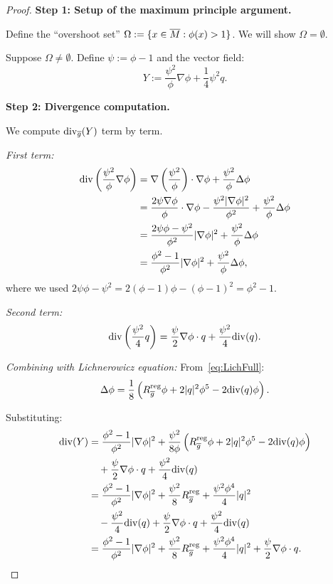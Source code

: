 \begin{proof}
\textbf{Step 1: Setup of the maximum principle argument.}

Define the ``overshoot set'' $\Omega := \{x \in \overline{M} : \phi(x) > 1\}$. We will show $\Omega = \emptyset$.

Suppose $\Omega \ne \emptyset$. Define $\psi := \phi - 1$ and the vector field:
\begin{equation}\label{eq:BKVectorField}
    Y := \frac{\psi^2}{\phi} \nabla \phi + \frac{1}{4} \psi^2 q.
\end{equation}

\textbf{Step 2: Divergence computation.}

We compute $\mathrm{div}_{\overline{g}}(Y)$ term by term.

\textit{First term:}
\begin{align}
    \mathrm{div}\left(\frac{\psi^2}{\phi} \nabla \phi\right) &= \nabla\left(\frac{\psi^2}{\phi}\right) \cdot \nabla \phi + \frac{\psi^2}{\phi} \Delta \phi \\
    &= \frac{2\psi \nabla \phi}{\phi} \cdot \nabla \phi - \frac{\psi^2 |\nabla \phi|^2}{\phi^2} + \frac{\psi^2}{\phi} \Delta \phi \\
    &= \frac{2\psi \phi - \psi^2}{\phi^2} |\nabla \phi|^2 + \frac{\psi^2}{\phi} \Delta \phi \\
    &= \frac{\phi^2 - 1}{\phi^2} |\nabla \phi|^2 + \frac{\psi^2}{\phi} \Delta \phi,
\end{align}
where we used $2\psi\phi - \psi^2 = 2(\phi-1)\phi - (\phi-1)^2 = \phi^2 - 1$.

\textit{Second term:}
\begin{equation}
    \mathrm{div}\left(\frac{\psi^2}{4} q\right) = \frac{\psi}{2} \nabla \phi \cdot q + \frac{\psi^2}{4} \mathrm{div}(q).
\end{equation}

\textit{Combining with Lichnerowicz equation:} From~\eqref{eq:LichFull}:
\begin{equation}
    \Delta \phi = \frac{1}{8}\left( R_{\overline{g}}^{\text{reg}} \phi + 2|q|^2 \phi^5 - 2\mathrm{div}(q) \phi \right).
\end{equation}

Substituting:
\begin{align}
    \mathrm{div}(Y) &= \frac{\phi^2 - 1}{\phi^2} |\nabla \phi|^2 + \frac{\psi^2}{8\phi}\left( R_{\overline{g}}^{\text{reg}} \phi + 2|q|^2 \phi^5 - 2\mathrm{div}(q)\phi \right) \\
    &\quad + \frac{\psi}{2} \nabla \phi \cdot q + \frac{\psi^2}{4} \mathrm{div}(q) \\
    &= \frac{\phi^2 - 1}{\phi^2} |\nabla \phi|^2 + \frac{\psi^2}{8} R_{\overline{g}}^{\text{reg}} + \frac{\psi^2 \phi^4}{4} |q|^2 \\
    &\quad - \frac{\psi^2}{4} \mathrm{div}(q) + \frac{\psi}{2} \nabla \phi \cdot q + \frac{\psi^2}{4} \mathrm{div}(q) \\
    &= \frac{\phi^2 - 1}{\phi^2} |\nabla \phi|^2 + \frac{\psi^2}{8} R_{\overline{g}}^{\text{reg}} + \frac{\psi^2 \phi^4}{4} |q|^2 + \frac{\psi}{2} \nabla \phi \cdot q.
\end{align}


\end{proof}
